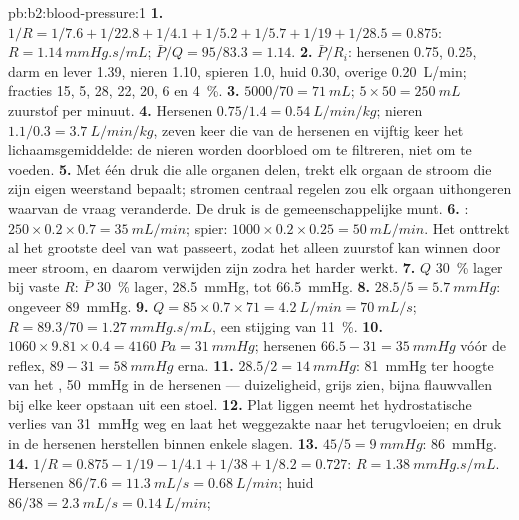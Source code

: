 \begin{solution}{pb:b2:blood-pressure:1}
\textbf{1.} $1/R = 1/7.6 + 1/22.8 + 1/4.1 + 1/5.2 + 1/5.7 + 1/19 +
1/28.5 = 0.875$: $R = \qty{1.14}{mmHg.s/mL}$; $\bar P/Q = 95/83.3 =
1.14$.
\textbf{2.} $\bar P/R_i$: hersenen 0.75,  0.25, darm en lever
1.39, nieren 1.10, spieren 1.0, huid 0.30, overige \qty{0.20}{L/min};
fracties 15, 5, 28, 22, 20, 6 en \qty{4}{\%}.
\textbf{3.} $5000/70 = \qty{71}{mL}$; $5\times 50 = \qty{250}{mL}$
zuurstof per minuut.
\textbf{4.} Hersenen $0.75/1.4 = \qty{0.54}{L/min/kg}$; nieren $1.1/0.3
= \qty{3.7}{L/min/kg}$, zeven keer die van de hersenen en vijftig keer het
lichaamsgemiddelde: de nieren worden doorbloed om te filtreren, niet om te
voeden.
\textbf{5.} Met één druk die alle organen delen, trekt elk orgaan de stroom
die zijn eigen weerstand bepaalt; stromen centraal regelen zou elk orgaan
uithongeren waarvan de vraag veranderde. De druk is de gemeenschappelijke
munt.
\textbf{6.} : $250\times 0.2\times 0.7 = \qty{35}{mL/min}$;
spier: $1000\times 0.2\times 0.25 = \qty{50}{mL/min}$. Het  onttrekt al
het grootste deel van wat passeert, zodat het alleen zuurstof kan winnen
door meer stroom, en daarom verwijden zijn  zodra het harder werkt.
\textbf{7.} $Q$ \qty{30}{\%} lager bij vaste $R$: $\bar P$
\qty{30}{\%} lager, \qty{28.5}{mmHg}, tot \qty{66.5}{mmHg}.
\textbf{8.} $28.5/5 = \qty{5.7}{mmHg}$: ongeveer \qty{89}{mmHg}.
\textbf{9.} $Q = 85\times 0.7\times 71 = \qty{4.2}{L/min} =
\qty{70}{mL/s}$; $R = 89.3/70 = \qty{1.27}{mmHg.s/mL}$, een stijging van
\qty{11}{\%}.
\textbf{10.} $1060\times 9.81\times 0.4 = \qty{4160}{Pa} =
\qty{31}{mmHg}$; hersenen $66.5 - 31 = \qty{35}{mmHg}$ vóór de reflex,
$89 - 31 = \qty{58}{mmHg}$ erna.
\textbf{11.} $28.5/2 = \qty{14}{mmHg}$: \qty{81}{mmHg} ter hoogte van het
, \qty{50}{mmHg} in de hersenen --- duizeligheid, grijs zien, bijna
flauwvallen bij elke keer opstaan uit een stoel.
\textbf{12.} Plat liggen neemt het hydrostatische verlies van
\qty{31}{mmHg} weg en laat het weggezakte  naar het  terugvloeien;
 en druk in de hersenen herstellen binnen enkele slagen.
\textbf{13.} $45/5 = \qty{9}{mmHg}$: \qty{86}{mmHg}.
\textbf{14.} $1/R = 0.875 - 1/19 - 1/4.1 + 1/38 + 1/8.2 = 0.727$: $R =
\qty{1.38}{mmHg.s/mL}$. Hersenen $86/7.6 = \qty{11.3}{mL/s} =
\qty{0.68}{L/min}$; huid $86/38 = \qty{2.3}{mL/s} = \qty{0.14}{L/min}$;

\end{solution}
